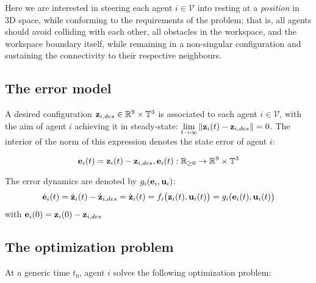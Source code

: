 Here we are interested in steering each agent $i \in \mathcal{V}$ into
resting at a \textit{position} in 3D space, while conforming to the requirements
of the problem; that is, all agents should avoid colliding with each other, all
obstacles in the workspace, and the workspace boundary itself, while remaining
in a non-singular configuration and sustaining the connectivity to their
respective neighbours.


\subsection{The error model}

A desired configuration $\bm{\mathbf{z}}_{i,des} \in \mathbb{R}^9 \times \mathbb{T}^3$
is associated to each agent $i \in \mathcal{V}$, with the aim of agent $i$
achieving it in steady-state:
$\lim\limits_{t \to \infty} \|\bm{\mathbf{z}}_i(t) - \bm{\mathbf{z}}_{i,des}\| = 0$. The
interior of the norm of this expression denotes the state error of agent $i$:

$$\bm{\mathbf{e}}_i(t) = \bm{\mathbf{z}}_i(t) - \bm{\mathbf{z}}_{i,des}, \bm{\mathbf{e}}_i(t) :
\mathbb{R}_{\geq 0} \to \mathbb{R}^9 \times \mathbb{T}^3$$

The error dynamics are denoted by $g_i(\bm{\mathbf{e}}_i, \bm{\mathbf{u}}_i)$:
\begin{align}
  \dot{\bm{\mathbf{e}}}_i(t) = \dot{\bm{\mathbf{z}}}_i(t) - \dot{\bm{\mathbf{z}}}_{i,des} =
  \dot{\bm{\mathbf{z}}}_i(t) = f_i\big(\bm{\mathbf{z}}_i(t), \bm{\mathbf{u}}_i(t)\big) = g_i(\bm{\mathbf{e}}_i(t), \bm{\mathbf{u}}_i(t)\big)
  \label{eq:position_based_error_model}
\end{align}
with $\bm{\mathbf{e}}_i(0) = \bm{\mathbf{z}}_i(0) - \bm{\mathbf{z}}_{i,des}$


\subsection{The optimization problem}

At a generic time $t_0$, agent $i$ solves the following optimization problem:

